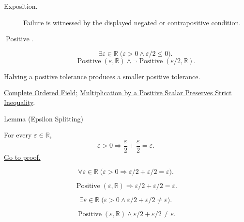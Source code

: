 \begin{remark*}
\begin{description}
  \item[Exposition.]
  Failure is witnessed by the displayed negated or contrapositive condition.

  \item[\(\operatorname{Positive}.\)]
  \[
\exists\varepsilon\in\mathbb{R}\;\bigl(\varepsilon>0\land \varepsilon/2\leq 0\bigr).
\]
\[
\operatorname{Positive}(\varepsilon,\mathbb{R})\land\neg\operatorname{Positive}(\varepsilon/2,\mathbb{R}).
\]
\end{description}
\end{remark*}
\begin{remark*}[Interpretation]
Halving a positive tolerance produces a smaller positive tolerance.
\end{remark*}
\begin{dependencies}
\hyperref[def:real-ordered-field]{Complete Ordered Field};
\hyperref[thm:ineq-multiply-positive]{Multiplication by a Positive Scalar Preserves Strict Inequality}.
\end{dependencies}

\begin{lemmabox}{Lemma (Epsilon Splitting)}
\begin{lemma}
\label{lem:epsilon-splitting}
For every $\varepsilon\in\mathbb{R}$,
\[
  \varepsilon>0
  \Longrightarrow
  \frac{\varepsilon}{2}+\frac{\varepsilon}{2}=\varepsilon.
\]
\hyperref[prf:epsilon-splitting]{Go to proof.}
\end{lemma}
\end{lemmabox}
\begin{remark*}
\[
\forall \varepsilon\in\mathbb{R}\;\bigl(\varepsilon>0\Longrightarrow
\varepsilon/2+\varepsilon/2=\varepsilon\bigr).
\]
\end{remark*}
\begin{remark*}
\[
\operatorname{Positive}(\varepsilon,\mathbb{R})\Longrightarrow
\varepsilon/2+\varepsilon/2=\varepsilon.
\]
\end{remark*}
\begin{remark*}
\[
\exists\varepsilon\in\mathbb{R}\;\bigl(\varepsilon>0\land
\varepsilon/2+\varepsilon/2\ne\varepsilon\bigr).
\]
\end{remark*}
\begin{remark*}
\[
\operatorname{Positive}(\varepsilon,\mathbb{R})\land
\varepsilon/2+\varepsilon/2\ne\varepsilon.
\]
\end{remark*}

